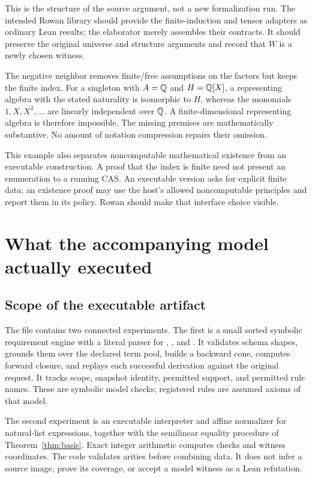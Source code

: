 \documentclass[11pt,letterpaper]{article}
\newcommand{\code}[1]{\texttt{\detokenize{#1}}}
\theoremstyle{definition}\newtheorem{definition}[theorem]{Definition}
\theoremstyle{remark}\newtheorem{remark}[theorem]{Remark}
\begin{document}
This is the structure of the source argument, not a new formalization run.
The intended Rowan library should provide the finite-induction and tensor
adapters as ordinary Lean results; the elaborator merely assembles their
contracts. It should preserve the original universe and structure arguments
and record that $W$ is a newly chosen witness.

The negative neighbor removes finite/free assumptions on the factors but
keeps the finite index. For a singleton with $A=\mathbb Q$ and $H=\mathbb Q[X]$, a
representing algebra with the stated naturality is isomorphic to $H$, whereas
the monomials $1,X,X^2,\ldots$ are linearly independent over $\mathbb Q$. A
finite-dimensional representing algebra is therefore impossible. The
missing premises are mathematically substantive. No amount of notation
compression repairs their omission.

This example also separates noncomputable mathematical existence from an
executable construction. A proof that the index is finite need not present
an enumeration to a running CAS. An executable version asks for explicit
finite data; an existence proof may use the host's allowed noncomputable
principles and report them in its policy. Rowan should make that interface
choice visible.

\section{What the accompanying model actually executed}
\label{sec:executed}

\subsection{Scope of the executable artifact}
The file \code{rowan_model.py} contains two connected experiments. The first
is a small sorted symbolic requirement engine with a literal parser for
\code{object}, \code{assume}, and \code{derive}. It validates schema shapes,
grounds them over the declared term pool, builds a backward cone, computes
forward closure, and replays each successful derivation against the original
request. It tracks scope, snapshot identity, permitted support, and permitted
rule names. These are symbolic model checks; registered rules are assumed
axioms of that model.

The second experiment is an executable interpreter and affine normalizer for
natural-list expressions, together with the semilinear equality procedure of
Theorem~\ref{thm:basis}. Exact integer arithmetic computes checks and witness
coordinates. The code validates arities before combining data. It does not
infer a source image, prove its coverage, or accept a model witness as a Lean
refutation.
\end{document}
